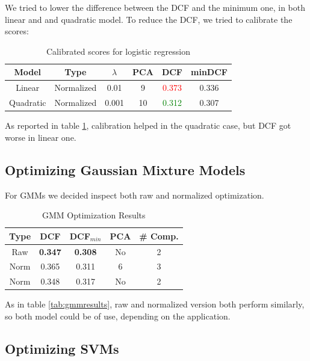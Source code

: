 \documentclass[12pt, twocolumn]{article}
\begin{document}
We tried to lower the difference between the DCF and the minimum one, in both linear and and quadratic model.
To reduce the DCF, we tried to calibrate the scores:

\begin{table}[H]
    \tiny
    \centering
        \begin{tabular}{||c|c|c|c|c|c||}
            \hline
            Model & Type & $\lambda$ & PCA & DCF & minDCF \\
            \hline
            \hline
            Linear & Normalized & 0.01 & 9 & \textcolor{red}{0.373} &  0.336  \\
            Quadratic & Normalized & 0.001 & 10 & \textcolor{green}{0.312} &  0.307  \\
            \hline
    \end{tabular}
    \caption{Calibrated scores for logistic regression}
    \label{logregcalibration}
\end{table}

As reported in table \ref{logregcalibration}, calibration helped in the quadratic case, 
but DCF got worse in linear one.

\subsection{Optimizing Gaussian Mixture Models}

For GMMs we decided inspect both raw and normalized optimization.

\begin{table}[H] 
    \centering
    \begin{tabular}{||c|c|c|c|c||}
        \hline
        Type & DCF & DCF$_{min}$ & PCA & \# Comp. \\
        \hline
        \hline
        Raw  & {\bf 0.347} & {\bf 0.308} & No & 2 \\
        Norm & 0.365 & 0.311 & 6  & 3 \\
        Norm & 0.348 & 0.317 & No & 2 \\
        \hline
    \end{tabular}
    \caption{GMM Optimization Results}
    \label{tab:gmmoptimization}
\end{table}

As in table \ref{tab:gmmresults}, raw and normalized version both perform similarly, so both model could be of use, depending on the application.

\subsection{Optimizing SVMs}
\end{document}
